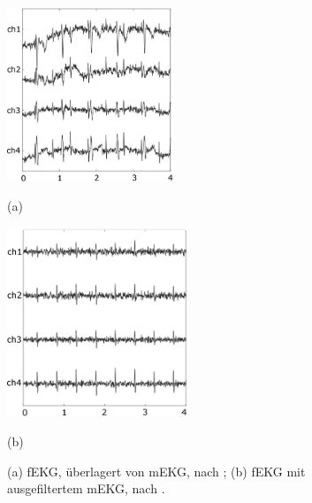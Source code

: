 \documentclass[10pt,a4paper,headinclude,twoside, plainheadsepline, open=right, numbers=noenddot, twocolumn]{article}
\begin{document}
\begin{figure}[tb]
 \centering
  \begin{minipage}[t]{5cm}
    \centering
 \includegraphics[height=5.20590cm]{./images/mEKG_fEKG.eps}
  \begin{center} (a)
     \end{center}
 \end{minipage} \hfill
   \begin{minipage}[t]{5cm}
    \centering
 \includegraphics[height=5.64585cm]{./images/fEKG.eps}
  \begin{center} (b)
     \end{center}
 \end{minipage} \hfill
 \caption{{(a) fEKG, überlagert von mEKG, nach \cite{warmerdam2018hierarchical}; (b) fEKG mit ausgefiltertem mEKG, nach \cite{warmerdam2018hierarchical}.\label{fig:fEKG}}}
\end{figure}


\end{document}
